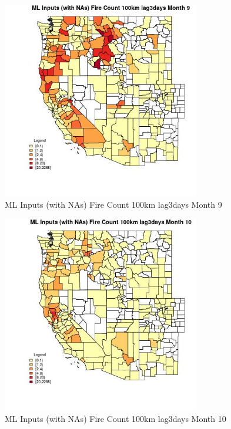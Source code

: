 \begin{figure} 
\centering  
\includegraphics[width=0.77\textwidth]{Code_Outputs/Report_ML_input_PM25_Step4_part_e_de_duplicated_aves_compiled_2019-05-20wNAs_CountyFire_Count_100km_lag3daysmedianMonth9.jpg} 
\caption{\label{fig:Report_ML_input_PM25_Step4_part_e_de_duplicated_aves_compiled_2019-05-20wNAsCountyFire_Count_100km_lag3daysmedianMonth9}ML Inputs (with NAs) Fire Count 100km lag3days Month 9} 
\end{figure} 
 

\begin{figure} 
\centering  
\includegraphics[width=0.77\textwidth]{Code_Outputs/Report_ML_input_PM25_Step4_part_e_de_duplicated_aves_compiled_2019-05-20wNAs_CountyFire_Count_100km_lag3daysmedianMonth10.jpg} 
\caption{\label{fig:Report_ML_input_PM25_Step4_part_e_de_duplicated_aves_compiled_2019-05-20wNAsCountyFire_Count_100km_lag3daysmedianMonth10}ML Inputs (with NAs) Fire Count 100km lag3days Month 10} 
\end{figure} 
 

